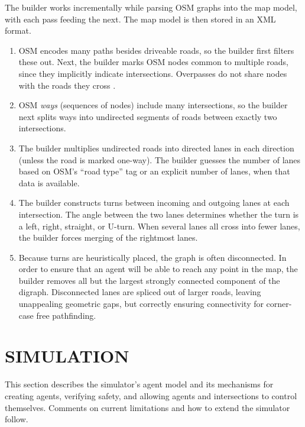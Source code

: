 \documentclass[letterpaper, 10 pt, conference]{ieeeconf}  %
\begin{document}
The builder works incrementally while parsing OSM graphs into the map model,
with each pass feeding the next. The map model is then stored in an XML format.
\begin{enumerate}
  \item OSM encodes many paths besides driveable roads, so the builder first filters
        these out. Next, the builder marks OSM nodes common to multiple roads, since
        they implicitly indicate intersections. Overpasses do not share nodes
        with the roads they cross \cite{osmOverpass}.
  \item OSM \emph{ways} (sequences of nodes) include many
        intersections, so the builder next splits ways into undirected
        segments of roads between exactly two intersections.
  \item The builder multiplies undirected roads into directed lanes in each
        direction (unless the road is marked one-way). The builder guesses the
        number of lanes based on OSM's ``road type'' tag or an explicit number of
        lanes, when that data is available.
  \item The builder constructs turns between incoming and outgoing lanes at each
        intersection. The angle between the two lanes determines whether the turn is
        a left, right, straight, or U-turn. When several lanes all cross into fewer
        lanes, the builder forces merging of the rightmost lanes. 
  \item Because turns are heuristically placed, the graph is often disconnected.
        In order to ensure that an agent will be able to reach any point in the map,
        the builder removes all but the largest strongly connected component of the
        digraph. Disconnected lanes are spliced out of larger roads, leaving
        unappealing geometric gaps, but correctly ensuring connectivity for
        corner-case free pathfinding.
\end{enumerate}


\section{SIMULATION}
\label{sec:simulation}

This section describes the simulator's agent model and its mechanisms for
creating agents, verifying safety, and allowing agents and intersections to
control themselves. Comments on current limitations and how to extend the
simulator follow.
\end{document}
